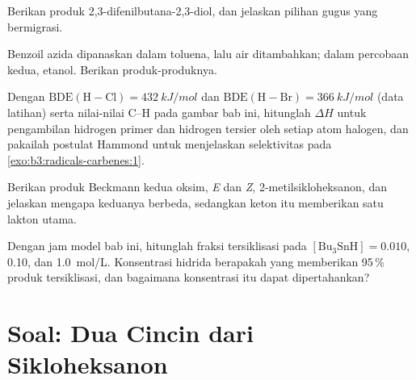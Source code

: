 \begin{exercise}[$\star\star$]\label{exo:b3:radicals-carbenes:8}
Berikan produk  2,3-difenilbutana-2,3-diol,
dan jelaskan pilihan gugus yang bermigrasi.
\end{exercise}

\begin{exercise}[$\star\star$]\label{exo:b3:radicals-carbenes:9}
Benzoil azida dipanaskan dalam toluena, lalu air ditambahkan; dalam percobaan kedua,
etanol. Berikan produk-produknya.
\end{exercise}

\begin{exercise}[$\star\star\star$]\label{exo:b3:radicals-carbenes:10}
Dengan $\mathrm{BDE(H{-}Cl)} = \qty{432}{kJ/mol}$ dan $\mathrm{BDE(H{-}Br)} = \qty{366}{kJ/mol}$ (data latihan) serta nilai-nilai C--H pada
gambar bab ini, hitunglah $\Delta H$ untuk pengambilan hidrogen primer dan hidrogen tersier
oleh setiap atom halogen, dan pakailah postulat Hammond untuk menjelaskan
selektivitas pada \cref{exo:b3:radicals-carbenes:1}.
\end{exercise}

\begin{exercise}[$\star\star\star$]\label{exo:b3:radicals-carbenes:11}
Berikan produk Beckmann kedua oksim, \textit{E} dan \textit{Z}, 2-metilsikloheksanon,
dan jelaskan mengapa keduanya berbeda, sedangkan  keton itu
memberikan satu lakton utama.
\end{exercise}

\begin{exercise}[$\star\star\star$]\label{exo:b3:radicals-carbenes:12}
Dengan jam model bab ini, hitunglah fraksi tersiklisasi pada $[\mathrm{Bu_3SnH}] = 0.010$,
0.10, dan \qty{1.0}{mol/L}. Konsentrasi hidrida berapakah yang memberikan 95\,\% produk tersiklisasi, dan bagaimana
konsentrasi itu dapat dipertahankan?
\end{exercise}

\section{Soal: Dua Cincin dari Sikloheksanon}

